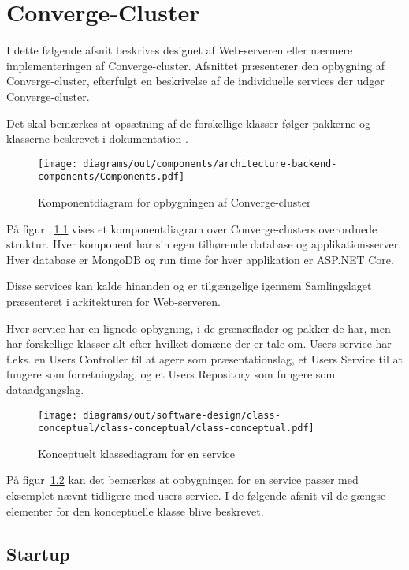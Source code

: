 \chapter{Converge-Cluster}

I dette følgende afsnit beskrives designet af Web-serveren eller nærmere implementeringen af Converge-cluster. Afsnittet præsenterer den opbygning af Converge-cluster, efterfulgt en beskrivelse af de individuelle services der udgør Converge-cluster. 

Det skal bemærkes at opsætning af de forskellige klasser følger pakkerne og klasserne beskrevet i dokumentation \cite{uml-diagrams}.

\begin{figure}[H]
  \centering
\texttt{[image: diagrams/out/components/architecture-backend-components/Components.pdf]}
\caption{Komponentdiagram for opbygningen af Converge-cluster}
\label{fig:component-converge-cluster}
\end{figure}

  På figur ~\ref{fig:component-converge-cluster} vises et komponentdiagram over Converge-clusters overordnede struktur. Hver komponent har sin egen tilhørende database og applikationsserver. Hver database er MongoDB og run time for hver applikation er ASP.NET Core.
  
  Disse services kan kalde hinanden og er tilgængelige igennem Samlingslaget præsenteret i arkitekturen for Web-serveren.
  
  Hver service har en lignede opbygning, i de grænseflader og pakker de har, men har forskellige klasser alt efter hvilket domæne der er tale om. Users-service har f.eks. en Users Controller til at agere som præsentationslag, et Users Service til at fungere som forretningslag, og et Users Repository som fungere som dataadgangslag.
  \newpage
  \begin{figure}[H]
    \centering
  \texttt{[image: diagrams/out/software-design/class-conceptual/class-conceptual/class-conceptual.pdf]}
  \caption{Konceptuelt klassediagram for en service}
  \label{fig:conceptual-class-service}
  \end{figure}

På figur~\ref{fig:conceptual-class-service} kan det bemærkes at opbygningen for en service passer med eksemplet nævnt tidligere med users-service. I de følgende afsnit vil de gængse elementer for den konceptuelle klasse blive beskrevet.

\section{Startup}

